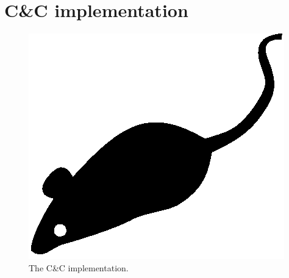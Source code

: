 \section{C\&C implementation}
\label{sec:cc-implementation}

\lipsum[1]

\begin{figure}[tp]
	\centering
	\includegraphics{./fig/acmlarge-mouse}
	\caption{The C\&C implementation.}
		\label{fig:cc-implementation}
\end{figure}

\lipsum[1]
